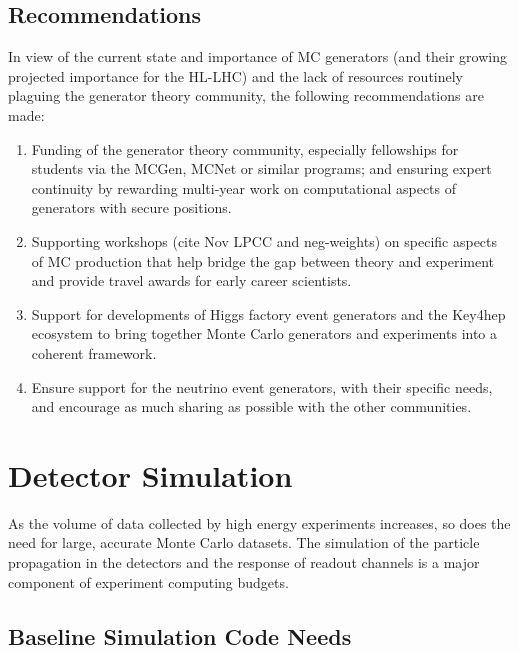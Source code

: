 \subsection{Recommendations}\label{recommendations}

In view of the current state and importance of MC generators (and their
growing projected importance for the HL-LHC) and the lack of resources
routinely plaguing the generator theory community, the following
recommendations are made:

\begin{enumerate}
\def\labelenumi{\arabic{enumi}.}
\item
  Funding of the generator theory community, especially fellowships for
  students via the MCGen, MCNet or similar programs; and ensuring expert
  continuity by rewarding multi-year work on computational aspects of
  generators with secure positions.
\item
  Supporting workshops (cite Nov LPCC and neg-weights) on specific
  aspects of MC production that help bridge the gap between theory and
  experiment and provide travel awards for early career scientists.
\item
  Support for developments of Higgs factory event generators and the
  Key4hep ecosystem to bring together Monte Carlo generators and
  experiments into a coherent framework.
\item
  Ensure support for the neutrino event generators, with their specific
  needs, and encourage as much sharing as possible with the other
  communities.
\end{enumerate}

\section{Detector Simulation}\label{detector-simulation}

As the volume of data collected by high energy experiments increases, so
does the need for large, accurate Monte Carlo datasets. The simulation
of the particle propagation in the detectors and the response of readout
channels is a major component of experiment computing budgets.

\subsection{Baseline Simulation Code
Needs}\label{baseline-simulation-code-needs}

